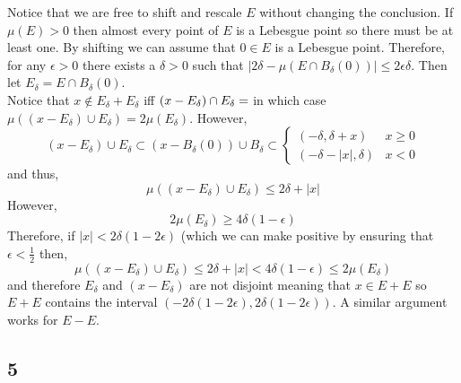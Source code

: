 \documentclass[12pt]{article}
\begin{document}
Notice that we are free to shift and rescale $E$ without changing the conclusion. If $\mu(E) > 0$ then almost every point of $E$ is a Lebesgue point so there must be at least one. By shifting we can assume that $0 \in E$ is a Lebesgue point. Therefore, for any $\epsilon > 0$ there exists a $\delta > 0$ such that $|2\delta - \mu(E \cap B_\delta(0))| \le 2\epsilon \delta$. Then let $E_\delta = E \cap B_\delta(0)$. 
\bigskip\\
Notice that $x \notin E_\delta + E_\delta$ iff $(x - E_\delta) \cap E_\delta = \empty$ in which case $\mu((x - E_\delta) \cup E_\delta) = 2 \mu(E_\delta)$. However,
\[ (x - E_\delta) \cup E_\delta \subset (x - B_\delta(0)) \cup B_\delta \subset 
\begin{cases}
(-\delta, \delta + x) & x \ge 0
\\
(- \delta - |x|, \delta) & x < 0
\end{cases} \]
and thus,
\[ \mu((x - E_\delta) \cup E_\delta) \le 2 \delta + |x| \]
However,
\[ 2 \mu(E_\delta) \ge 4 \delta (1 - \epsilon) \]
Therefore, if $|x| < 2 \delta (1 - 2 \epsilon)$ (which we can make positive by ensuring that $\epsilon < \tfrac{1}{2}$ then,
\[ \mu((x - E_\delta) \cup E_\delta) \le 2 \delta + |x| < 4 \delta (1 - \epsilon) \le 2 \mu(E_\delta) \]
and therefore $E_\delta$ and $(x - E_\delta)$ are not disjoint meaning that $x \in E + E$ so $E + E$ contains the interval $(-2 \delta(1 - 2 \epsilon), 2 \delta(1 - 2 \epsilon))$. A similar argument works for $E - E$.

\subsection{5}
\end{document}
